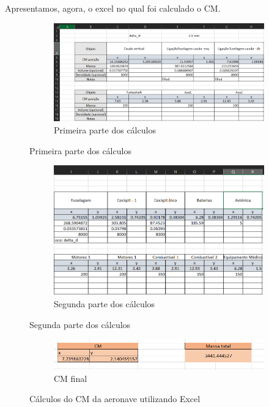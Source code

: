 Apresentamos, agora, o excel no qual foi calculado o CM. 
\FloatBarrier
\begin{figure}
\centering
    \begin{subfigure}[h]{\textwidth}
        \centering
        \includegraphics[width=\textwidth]{Imagens/excelp1.PNG}
        \caption{Primeira parte dos cálculos}
        \label{excelCM_p1}
    \end{subfigure}
\end{figure}
\begin{figure}\ContinuedFloat
    \begin{subfigure}[h]{\textwidth}
        \centering
        \includegraphics[width=\textwidth]{Imagens/excelp2.PNG}
        \caption{Segunda parte dos cálculos}
        \label{excelCM_p2}
    \end{subfigure}
\end{figure}
\begin{figure}\ContinuedFloat
    \begin{subfigure}[h]{\textwidth}
        \centering
        \includegraphics[width=\textwidth]{Imagens/excelp3.PNG}
        \caption{CM final}
        \label{excelCM_p3}
    \end{subfigure}
    \caption{Cálculos do CM da aeronave utilizando Excel}
    \label{excelCM_total}
\end{figure}
